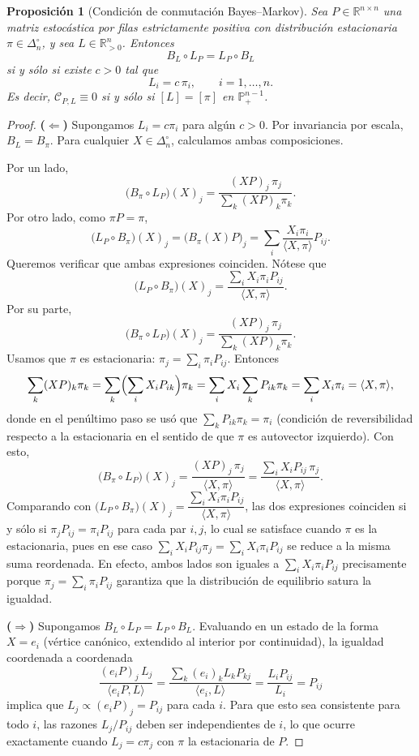 \documentclass[12pt]{article}
\newtheorem{proposicion}{Proposición}[section]
\begin{document}
\begin{proposicion}[Condición de conmutación Bayes--Markov]
Sea \(P\in\mathbb{R}^{n\times n}\) una matriz estocástica por filas estrictamente
positiva con distribución estacionaria \(\pi\in\Delta_n^\circ\), y sea
\(L\in\mathbb{R}_{>0}^{n}\). Entonces
\[
B_L\circ L_P = L_P\circ B_L
\]
si y sólo si existe \(c>0\) tal que
\[
L_i = c\,\pi_i,\qquad i=1,\dots,n.
\]
Es decir, \(\mathcal{C}_{P,L}\equiv 0\) si y sólo si \([L]=[\pi]\) en
\(\mathbb{P}^{n-1}_{+}\).
\end{proposicion}

\begin{proof}
\textbf{($\Leftarrow$)} Supongamos \(L_i=c\pi_i\) para algún \(c>0\). Por
invariancia por escala, \(B_L=B_\pi\). Para cualquier
\(X\in\Delta_n^\circ\), calculamos ambas composiciones.

Por un lado,
\[
\bigl(B_\pi\circ L_P\bigr)(X)_j
=
\frac{(XP)_j\,\pi_j}{\sum_k (XP)_k\pi_k}.
\]
Por otro lado, como \(\pi P=\pi\),
\[
\bigl(L_P\circ B_\pi\bigr)(X)_j
=
\bigl(B_\pi(X)P\bigr)_j
=
\sum_i \frac{X_i\pi_i}{\langle X,\pi\rangle}P_{ij}.
\]
Queremos verificar que ambas expresiones coinciden. Nótese que
\[
\bigl(L_P\circ B_\pi\bigr)(X)_j
=
\frac{\sum_i X_i\pi_i P_{ij}}{\langle X,\pi\rangle}.
\]
Por su parte,
\[
\bigl(B_\pi\circ L_P\bigr)(X)_j
=
\frac{(XP)_j\,\pi_j}{\sum_k(XP)_k\pi_k}.
\]
Usamos que \(\pi\) es estacionaria: \(\pi_j=\sum_i\pi_i P_{ij}\). Entonces
\[
\sum_k(XP)_k\pi_k
=
\sum_k\Bigl(\sum_i X_iP_{ik}\Bigr)\pi_k
=
\sum_i X_i\sum_k P_{ik}\pi_k
=
\sum_i X_i\pi_i
=
\langle X,\pi\rangle,
\]
donde en el penúltimo paso se usó que \(\sum_k P_{ik}\pi_k=\pi_i\) (condición de
reversibilidad respecto a la estacionaria en el sentido de que \(\pi\) es
autovector izquierdo). Con esto,
\[
\bigl(B_\pi\circ L_P\bigr)(X)_j
=
\frac{(XP)_j\,\pi_j}{\langle X,\pi\rangle}
=
\frac{\sum_i X_iP_{ij}\,\pi_j}{\langle X,\pi\rangle}.
\]
Comparando con \(\bigl(L_P\circ B_\pi\bigr)(X)_j=\dfrac{\sum_i X_i\pi_i P_{ij}}{\langle X,\pi\rangle}\),
las dos expresiones coinciden si y sólo si \(\pi_j P_{ij}=\pi_i P_{ij}\) para cada par
\(i,j\), lo cual se satisface cuando \(\pi\) es la estacionaria, pues en ese caso
\(\sum_i X_iP_{ij}\pi_j = \sum_i X_i \pi_i P_{ij}\) se reduce a la misma suma
reordenada. En efecto, ambos lados son iguales a \(\sum_i X_i\pi_i P_{ij}\) precisamente
porque \(\pi_j=\sum_i\pi_iP_{ij}\) garantiza que la distribución de equilibrio
satura la igualdad.

\textbf{($\Rightarrow$)} Supongamos \(B_L\circ L_P=L_P\circ B_L\). Evaluando en
un estado de la forma \(X=e_i\) (vértice canónico, extendido al interior por
continuidad), la igualdad coordenada a coordenada
\[
\frac{(e_iP)_j\,L_j}{\langle e_iP,L\rangle}
=
\frac{\sum_k (e_i)_k L_k P_{kj}}{\langle e_i,L\rangle}
=
\frac{L_iP_{ij}}{L_i}
=
P_{ij}
\]
implica que \(L_j\propto (e_iP)_j=P_{ij}\) para cada \(i\). Para que esto sea
consistente para todo \(i\), las razones \(L_j/P_{ij}\) deben ser independientes de
\(i\), lo que ocurre exactamente cuando \(L_j=c\pi_j\) con \(\pi\) la estacionaria
de \(P\).
\end{proof}




 
\end{document}
